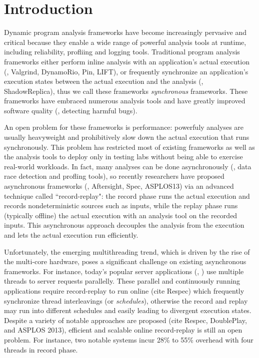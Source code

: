 \section{Introduction} \label{sec:intro}



Dynamic program analysis frameworks have become increasingly pervasive and 
critical because they enable a wide range of powerful analysis tools at 
runtime, including reliability, profliing and logging tools. 
Traditional program analysis frameworks either perform inline analysis with an 
application's actual execution (\eg, Valgrind, DynamoRio, Pin, LIFT), or 
frequently synchronize an application's execution states between the actual 
execution and the analysis (\eg, ShadowReplica), thus we call these frameworks 
\emph{synchronous} frameworks. These frameworks have embraced numerous analysis 
tools and have greatly improved software quality (\eg, detecting harmful bugs).


An open problem for these frameworks is performance: powerfuly analyses are 
usually heavyweight and prohibitively slow down the actual execution that 
runs synchronously. This problem has restricted most of existing frameworks as 
well as the analysis tools to deploy only in testing labs without being able 
to exercise real-world workloads. In fact, many analyses can be done 
asynchronously (\eg, data race detection and profling tools), so recently 
researchers have proposed asynchronous frameworks (\eg, Aftersight, Spec, 
ASPLOS13) via an advanced technique called ``record-replay": the record 
phase runs the actual execution and records nondeterministic sources such as 
inputs, while the replay phase runs (typically offline) the actual execution 
with an analysis tool on the recorded inputs. This asynchronous approach 
decouples the analysis from the execution and lets the actual execution run 
efficiently.


Unfortunately, the emerging multithreading trend, which is driven by the rise 
of the multi-core hardware, poses a significant challenge on existing 
asynchronous frameworks. For instance, today's popular server applications 
(\eg, \apache) use multiple threads to server requests parallelly. These 
parallel and continuously running applications require record-replay to run 
online (cite Respec) which frequently synchronize thread interleavings (or 
\emph{schedules}), otherwise the record and replay may run into different 
schedules and easily leading to divergent execution states. Despite a variety 
of notable approaches are proposed (cite Respec, DoublePlay, and ASPLOS 2013), 
efficient and scalable online record-replay is still an open problem. For 
instance, two notable systems incur 28\% to 55\% overhead with four threads in 
record phase.

